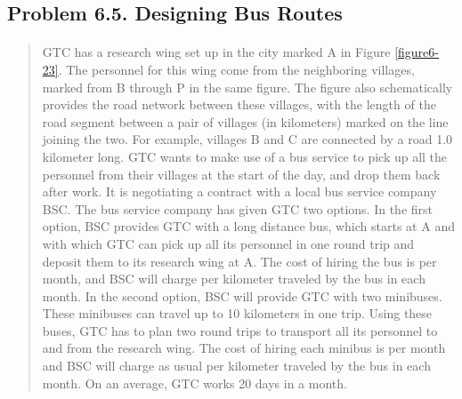 \subsection{Problem 6.5. Designing Bus Routes}

\paragraph{}
\begin{quote}
GTC has a research wing set up in the city marked A in Figure \ref{figure6-23}. The personnel for this wing come from the neighboring villages, marked from B through P in the same figure. The figure also schematically provides the road network between these villages, with the length of the road segment between a pair of villages (in kilometers) marked on the line joining the two. For example, villages B and C are connected by a road 1.0 kilometer long.
GTC wants to make use of a bus service to pick up all the personnel from their villages at the start of the day, and drop them back after work. It is negotiating a contract with a local bus service company BSC. The bus service company has given GTC two options.
In the first option, BSC provides GTC with a long distance bus, which starts at A and with which GTC can pick up all its personnel in one round trip and deposit them to its research wing at A. The cost of hiring the bus is  per month, and BSC will charge  per kilometer traveled by the bus in each month.
In the second option, BSC will provide GTC with two minibuses. These minibuses can travel up to 10 kilometers in one trip. Using these buses, GTC has to plan two round trips to transport all its personnel to and from the research wing. The cost of hiring each minibus is  per month and BSC will charge as usual  per kilometer traveled by the bus in each month.
On an average, GTC works 20 days in a month.
\end{quote}


